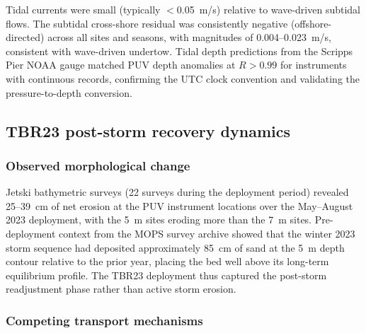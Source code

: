 Tidal currents were small (typically $<$0.05~m/s) relative to
wave-driven subtidal flows. The subtidal cross-shore residual was
consistently negative (offshore-directed) across all sites and
seasons, with magnitudes of 0.004--0.023~m/s, consistent with
wave-driven undertow. Tidal depth predictions from the Scripps Pier
NOAA gauge matched PUV depth anomalies at $R > 0.99$ for instruments
with continuous records, confirming the UTC clock convention and
validating the pressure-to-depth conversion.

\subsection{TBR23 post-storm recovery dynamics}


\subsubsection{Observed morphological change}

Jetski bathymetric surveys (22 surveys during the deployment period)
revealed 25--39~cm of net erosion at the PUV instrument locations
over the May--August 2023 deployment, with the 5~m sites eroding
more than the 7~m sites. Pre-deployment context from the MOPS survey
archive showed that the winter 2023 storm sequence had deposited
approximately 85~cm of sand at the 5~m depth contour relative to the
prior year, placing the bed well above its long-term equilibrium
profile. The TBR23 deployment thus captured the post-storm
readjustment phase rather than active storm erosion.

\subsubsection{Competing transport mechanisms}

